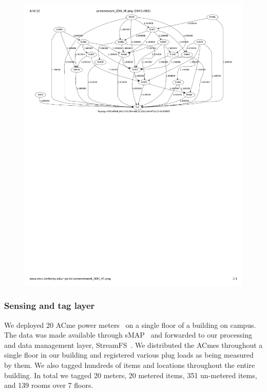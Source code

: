 \begin{figure}[htb!]
\begin{center}
\includegraphics[scale=0.4]{figs/acmenetwork_SDH_4F}
\caption{}
\label{fig:acmenetwork_SDH_4F}
\end{center}
\end{figure}
\subsubsection{Sensing and tag layer}
We deployed 20 ACme power meters~\cite{acme} on a single floor of a building on campus.  The data was made available through
sMAP~\cite{smap} and forwarded to our processing and data management layer, StreamFS~\cite{streamfs}.  We distributed
the ACmes throughout a single floor in our building and registered various plug loads as being measured by them.  We also tagged
hundreds of items and locations throughout the entire building.  In total we tagged 20 meters, 20 metered items, 351 un-metered items,
 and 139 rooms over 7 floors.

